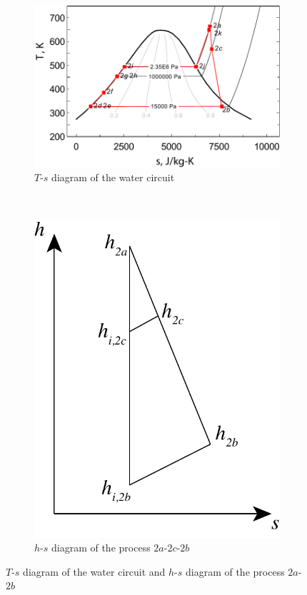 \noindent \begin{figure}[htbp]
\centering
	\begin{subfigure}[b]{0.6\columnwidth}
	\includegraphics[width = \columnwidth]{fig/T-s_Water.pdf}
	\caption{$T$-$s$ diagram of the water circuit}\label{fig:Ts_Water}
	\end{subfigure}
	~
\begin{subfigure}[b]{0.3\columnwidth}
	\includegraphics[width = \columnwidth]{fig/SteamTurbine_hs.pdf}
	\caption{$h$-$s$ diagram of the process $2a$-$2c$-$2b$}\label{fig:SteamTurbine_hs}
	\end{subfigure}
	
	\caption{$T$-$s$ diagram of the water circuit and $h$-$s$ diagram of the process $2a$-$2b$}\label{fig:SteamTurbine_hs_p}
\end{figure}

